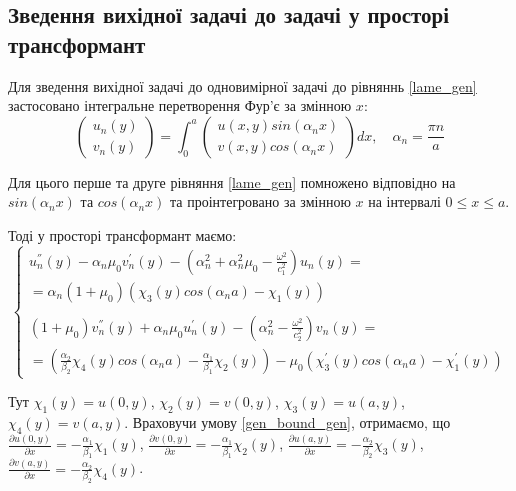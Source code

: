 \subsection{Зведення вихідної задачі до задачі у просторі трансформант}
Для зведення вихідної задачі до одновимірної задачі до рівняннь \eqref{lame_gen} застосовано інтегральне перетворення Фур'є за змінною $x$:
\begin{equation}\label{int_trans_gen}
    \begin{pmatrix}
        u_n(y) \\
        v_n(y)
    \end{pmatrix} = \int_{0}^{a} 
    \begin{pmatrix}
        u(x,y) sin(\alpha_n x) \\
        v(x,y) cos(\alpha_n x)
    \end{pmatrix} dx, \quad \alpha_n = \frac{\pi n}{a}
\end{equation}

Для цього перше та друге рівняння \eqref{lame_gen} помножено відповідно на $sin(\alpha_n x)$ та $cos(\alpha_n x)$ та проінтегровано за змінною $x$ на інтервалі $0 \le x \le a$.

Тоді у просторі трансформант маємо:
\begin{equation}\label{transf_gen}
    \begin{cases}
        u_n^{''}(y) - \alpha_n \mu_0 v_n^{'}(y) - (\alpha_n^2 + \alpha_n^2 \mu_0 - \frac{\omega^2}{c_1^2}) u_n(y) = \\
        = \alpha_n(1 + \mu_0)(\chi_3(y) cos(\alpha_n a) - \chi_1(y)) \\
        \\
        (1 + \mu_0) v_n^{''}(y) + \alpha_n \mu_0 u_n^{'}(y) - (\alpha_n^2 - \frac{\omega^2}{c_2^2}) v_n(y) = \\
        = (\frac{\alpha_2}{\beta_2}\chi_4(y) cos(\alpha_n a) - \frac{\alpha_1}{\beta_1}\chi_2(y)) - \mu_0 (\chi_3^{'}(y) cos(\alpha_n a) -\chi_1^{'}(y))
    \end{cases}
\end{equation}

Тут $\chi_1(y) = u(0, y)$, $\chi_2(y) = v(0, y)$, $\chi_3(y) = u(a, y)$, $\chi_4(y) = v(a, y)$.
Враховучи умову \eqref{gen_bound_gen}, отримаємо, що 
$\frac{\partial u(0, y)}{\partial x}=-\frac{\alpha_1}{\beta_1} \chi_1(y)$,
$\frac{\partial v(0, y)}{\partial x}=-\frac{\alpha_1}{\beta_1} \chi_2(y)$,
$\frac{\partial u(a, y)}{\partial x}=-\frac{\alpha_2}{\beta_2} \chi_3(y)$,
$\frac{\partial v(a, y)}{\partial x}=-\frac{\alpha_2}{\beta_2} \chi_4(y)$.

